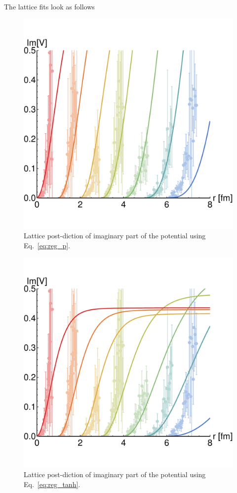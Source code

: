 \documentclass[12pt,a4paper]{article}
\begin{document}
\clearpage
The lattice fits look as follows
\begin{figure}[H]
	\centering
	\includegraphics[width=\textwidth]{ImV_lat_p} 
	\caption{Lattice post-diction of imaginary part of the potential using Eq.~\eqref{eq:reg_p}.}
	\label{fig:ImVs_tanh}
\end{figure}
\begin{figure}[H]
	\centering
	\includegraphics[width=\textwidth]{ImV_lat_tanh} 
	\caption{Lattice post-diction of imaginary part of the potential using Eq.~\eqref{eq:reg_tanh}.}
	\label{fig:ImVs_tanh}
\end{figure}
\end{document}
